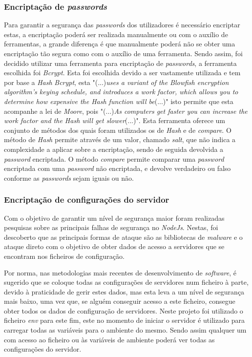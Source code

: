 \subsubsection{Encriptação de \textit{passwords}}
Para garantir a segurança das \textit{passwords} dos utilizadores é necessário encriptar estas, a encriptação poderá ser realizada manualmente ou com o auxílio de ferramentas, a grande diferença é que manualmente poderá não se obter uma encriptação tão segura como com o auxílio de uma ferramenta. Sendo assim, foi decidido utilizar uma ferramenta para encriptação de \textit{passwords}, a ferramenta escolhida foi \textit{Bcrypt}. Esta foi escolhida devido a ser vastamente utilizada e tem por base a \emph{Hash} \textit{Bcrypt}, esta "(...)\emph{uses a variant of the Blowfish encryption algorithm’s keying schedule, and introduces a work factor, which allows you to determine how expensive the Hash function will be}(...)"\citep{Bcrypt} isto permite que esta acompanhe a lei de \emph{Moore}, pois "(...)\emph{As computers get faster you can increase the work factor and the Hash will get slower}(...)"\citep{Bcrypt}. Esta ferramenta oferece um conjunto de métodos dos quais foram utilizados os de \emph{Hash} e de \emph{compare}. O método de \emph{Hash} permite através de um valor, chamado \textit{salt}, que não indica a complexidade a aplicar sobre a encriptação, sendo de seguida devolvida a \textit{password} encriptada. O método \emph{compare} permite comparar uma \textit{password} encriptada com uma \textit{password} não encriptada, e devolve verdadeiro ou falso conforme as \textit{passwords} sejam iguais ou não.

\newpage
\subsubsection{Encriptação de configurações do servidor}
Com o objetivo de garantir um nível de segurança maior foram realizadas pesquisas sobre as principais falhas de segurança no \textit{NodeJs}. Nestas, foi descoberto que as principais formas de ataque são as bibliotecas de \textit{malware} e o ataque direto com o objetivo de obter dados de acesso a servidores que se encontram nos ficheiros de configuração.

Por norma, nas metodologias mais recentes de desenvolvimento de \emph{software}, é sugerido que se coloque todas as configurações de servidores num ficheiro à parte, devido à praticidade de gerir estes dados, mas esta leva a um nível de segurança mais baixo, uma vez que, se alguém conseguir acesso a este ficheiro, consegue obter todos os dados de configuração de servidores. Neste projeto foi utilizado o ficheiro \textit{env} para este fim, este no momento de iniciar o servidor é utilizado para carregar todas as variáveis para o ambiente do mesmo. Sendo assim qualquer um com acesso ao ficheiro ou às variáveis de ambiente poderá ver todas as configurações do servidor.

